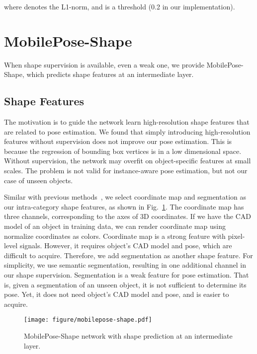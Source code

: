 \documentclass[runningheads]{llncs}
\begin{document}
where  denotes the L1-norm, and  is a threshold (0.2 in our implementation).

\section{MobilePose-Shape}
When shape supervision is available, even a weak one, we provide MobilePose-Shape, which predicts shape features at an intermediate layer.

\subsection{Shape Features}
The motivation is to guide the network learn high-resolution shape features that are related to pose estimation. We found that simply introducing high-resolution features without supervision does not improve our pose estimation. This is because the regression of bounding box vertices is in a low dimensional space. Without supervision, the network may overfit on object-specific features at small scales. The problem is not valid for instance-aware pose estimation, but not our case of unseen objects. 

Similar with previous methods~\cite{Hu_2019_Segmentation,Wang_2019_NOCS,Li_2019_CDPN,Park_2019_Pix2Pose}, we select coordinate map and segmentation as our intra-category shape features, as shown in Fig.~\ref{fig:shape}. The coordinate map has three channels, corresponding to the axes of 3D coordinates. If we have the CAD model of an object in training data, we can render coordinate map using normalize coordinates as colors. Coordinate map is a strong feature with pixel-level signals. However, it requires object's CAD model and pose, which are difficult to acquire. Therefore, we add segmentation as another shape feature. For simplicity, we use semantic segmentation, resulting in one additional channel in our shape supervision. Segmentation is a weak feature for pose estimation. That is, given a segmentation of an unseen object, it is not sufficient to determine its pose. Yet, it does not need object's CAD model and pose, and is easier to acquire.

\begin{figure}[t]
    \centering
    \texttt{[image: figure/mobilepose-shape.pdf]}
    \caption{MobilePose-Shape network with shape prediction at an intermediate layer.}
    \label{fig:shape}
\end{figure}
\end{document}
